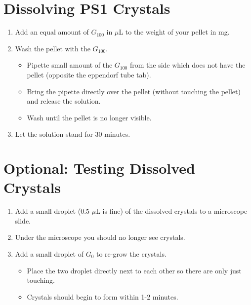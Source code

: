 \documentclass[12pt]{article}
\begin{document}
    \section{Dissolving PS1 Crystals}
    \begin{enumerate}
        \item Add an equal amount of $G_{100}$ in $\mu$L to the weight of your pellet in mg.
        \item Wash the pellet with the $G_{100}$.
        \begin{itemize}
            \item Pipette small amount of the $G_{100}$ from the side which does not have the pellet (opposite the eppendorf tube tab).
            \item Bring the pipette directly over the pellet (without touching the pellet) and release the solution.
            \item Wash until the pellet is no longer visible.
        \end{itemize}
        \item Let the solution stand for 30 minutes.
    \end{enumerate}

    \section{Optional: Testing Dissolved Crystals}
    \begin{enumerate}
        \item Add a small droplet (0.5 $\mu$L is fine) of the dissolved crystals to a microscope slide.
        \item Under the microscope you should no longer see crystals.
        \item Add a small droplet of $G_{0}$ to re-grow the crystals.
        \begin{itemize}
            \item Place the two droplet directly next to each other so there are only just touching.
            \item Crystals should begin to form within 1-2 minutes.
        \end{itemize}
    \end{enumerate}
\end{document}
